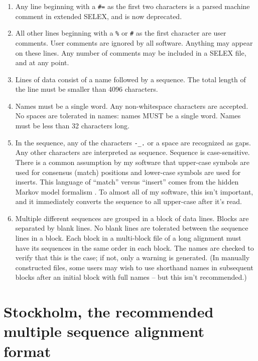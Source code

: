 \begin{enumerate}
\item
Any line beginning with a \verb+#=+ as the first two characters is a
parsed machine comment in extended SELEX, and is now deprecated. 

\item
All other lines beginning with a \verb+%+ or \verb+#+ as the first
character are user comments.  User comments are ignored by all
software. Anything may appear on these lines. Any number of comments
may be included in a SELEX file, and at any point.

\item
Lines of data consist of a name followed by a sequence. The total
length of the line must be smaller than 4096 characters.

\item
Names must be a single word. Any non-whitespace characters are
accepted.  No spaces are tolerated in names: names MUST be a
single word. Names must be less than 32 characters long.

\item In the sequence, any of the characters \verb+-_.+ or a space are
recognized as gaps. Any other characters are interpreted as sequence.
Sequence is case-sensitive. There is a common assumption by my
software that upper-case symbols are used for consensus (match)
positions and lower-case symbols are used for inserts. This language
of ``match'' versus ``insert'' comes from the hidden Markov model
formalism \cite{Krogh94}. To almost all of my software, this isn't
important, and it immediately converts the sequence to all upper-case
after it's read.

\item
Multiple different sequences are grouped in a block of data lines.
Blocks are separated by blank lines. No blank lines are tolerated
between the sequence lines in a block. Each block in a multi-block
file of a long alignment must have its sequences in the same order in
each block. The names are checked to verify that this is the case; if
not, only a warning is generated. (In manually constructed files, some
users may wish to use shorthand names in subsequent blocks after an
initial block with full names -- but this isn't recommended.)
\end{enumerate}

\section{Stockholm, the recommended multiple sequence alignment format}

